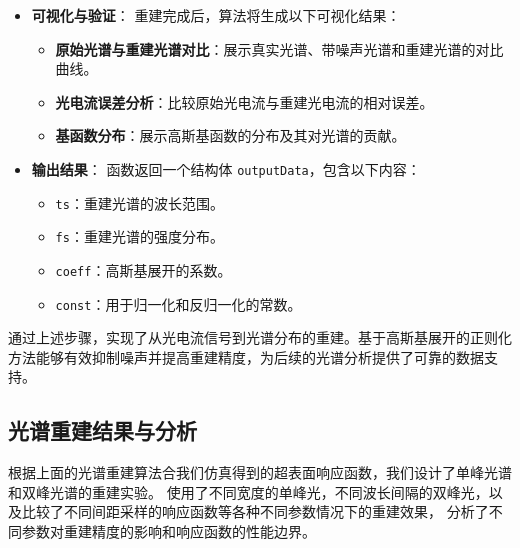 \documentclass[12pt,hyperref,a4paper,UTF8]{ctexart}
\begin{document}
\begin{itemize}
\begin{enumerate}
        \item \textbf{求解优化问题}：
        使用 Tikhonov 正则化方法，求解以下优化问题：
        \[
        \min_{\alpha} \|\mathbf{\Phi} \alpha - \mathbf{I}\|_2^2 + \lambda \|\alpha\|_2^2
        \]
        其中，\(\alpha\) 为待求的高斯基展开系数，\(\mathbf{I}\) 为光电流信号，\(\lambda\) 为正则化参数。

        \item \textbf{重建光谱}：
        将求解得到的系数 \(\alpha\) 代入高斯基展开公式，重建出原始光谱：
        \[
        f(\lambda) = \sum_{i=1}^{N} \alpha_i \varphi_i(\lambda)
        \]
        其中，\(\varphi_i(\lambda)\) 为高斯基函数，其形式为：
        \[
        \varphi_i(\lambda) = \frac{1}{\sqrt{2\pi}\sigma} \exp\left(-\frac{(\lambda - \lambda_i)^2}{2\sigma^2}\right)
        \]
        \(\sigma\) 为高斯函数的宽度，\(\lambda_i\) 为基函数的中心位置。
    \end{enumerate}

    \item \textbf{可视化与验证}：
    重建完成后，算法将生成以下可视化结果：
    \begin{itemize}
        \item \textbf{原始光谱与重建光谱对比}：展示真实光谱、带噪声光谱和重建光谱的对比曲线。
        \item \textbf{光电流误差分析}：比较原始光电流与重建光电流的相对误差。
        \item \textbf{基函数分布}：展示高斯基函数的分布及其对光谱的贡献。
    \end{itemize}

    \item \textbf{输出结果}：
    函数返回一个结构体 \texttt{outputData}，包含以下内容：
    \begin{itemize}
        \item \texttt{ts}：重建光谱的波长范围。
        \item \texttt{fs}：重建光谱的强度分布。
        \item \texttt{coeff}：高斯基展开的系数。
        \item \texttt{const}：用于归一化和反归一化的常数。
    \end{itemize}
\end{itemize}

通过上述步骤，实现了从光电流信号到光谱分布的重建。基于高斯基展开的正则化方法能够有效抑制噪声并提高重建精度，为后续的光谱分析提供了可靠的数据支持。




\subsection{光谱重建结果与分析}
根据上面的光谱重建算法合我们仿真得到的超表面响应函数，我们设计了单峰光谱和双峰光谱的重建实验。
使用了不同宽度的单峰光，不同波长间隔的双峰光，以及比较了不同间距采样的响应函数等各种不同参数情况下的重建效果，
分析了不同参数对重建精度的影响和响应函数的性能边界。
\end{document}
